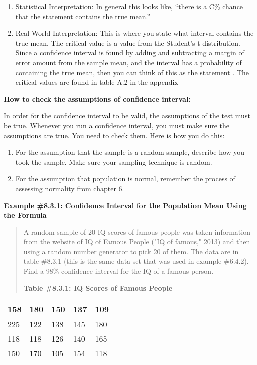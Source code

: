 \documentclass[]{book}
\begin{document}
\begin{enumerate}
\def\labelenumi{\arabic{enumi}.}
\setcounter{enumi}{3}
\item
  Statistical Interpretation: In general this looks like, ``there is a C\% chance that the statement contains the true mean.''
\item
  Real World Interpretation: This is where you state what interval contains the true mean.
  The critical value is a value from the Student's t-distribution. Since a
  confidence interval is found by adding and subtracting a margin of error
  amount from the sample mean, and the interval has a probability of
  containing the true mean, then you can think of this as the statement .
  The critical values are found in table A.2 in the appendix
\end{enumerate}

\textbf{How to check the assumptions of confidence interval:}

In order for the confidence interval to be valid, the assumptions of the
test must be true. Whenever you run a confidence interval, you must make
sure the assumptions are true. You need to check them. Here is how you
do this:

\begin{enumerate}
\def\labelenumi{\arabic{enumi}.}
\item
  For the assumption that the sample is a random sample, describe how
  you took the sample. Make sure your sampling technique is random.
\item
  For the assumption that population is normal, remember the process
  of assessing normality from chapter 6.
\end{enumerate}

\textbf{Example \#8.3.1: Confidence Interval for the Population Mean Using the
Formula}

\begin{quote}
A random sample of 20 IQ scores of famous people was taken information
from the website of IQ of Famous People ("IQ of famous," 2013) and
then using a random number generator to pick 20 of them. The data are
in table \#8.3.1 (this is the same data set that was used in example
\#6.4.2). Find a 98\% confidence interval for the IQ of a famous
person.

\textbf{Table \#8.3.1: IQ Scores of Famous People}
\end{quote}

\begin{longtable}[]{@{}lllll@{}}
\toprule
158 & 180 & 150 & 137 & 109\tabularnewline
\midrule
\endhead
225 & 122 & 138 & 145 & 180\tabularnewline
118 & 118 & 126 & 140 & 165\tabularnewline
150 & 170 & 105 & 154 & 118\tabularnewline
\bottomrule
\end{longtable}
\end{document}

